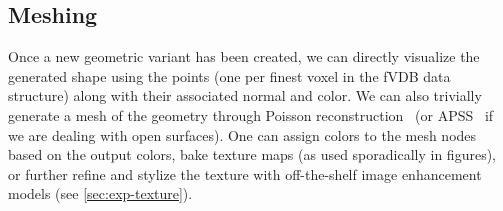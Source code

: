 



\subsection{Meshing}\label{sec:meshing}
Once a new geometric variant has been created, we can directly visualize the generated shape using the points (one per finest voxel in the fVDB data structure) along with their associated normal and color. We can also trivially generate a mesh of the geometry through Poisson reconstruction~\cite{kazhdan_screened_2013} (or APSS~\cite{guennebaud_algebraic_2007} if we are dealing with open surfaces). One can assign colors to the mesh nodes based on the output colors, bake texture maps (as used sporadically in figures), or further refine and stylize the texture with off-the-shelf image enhancement models (see \cref{sec:exp-texture}).  

